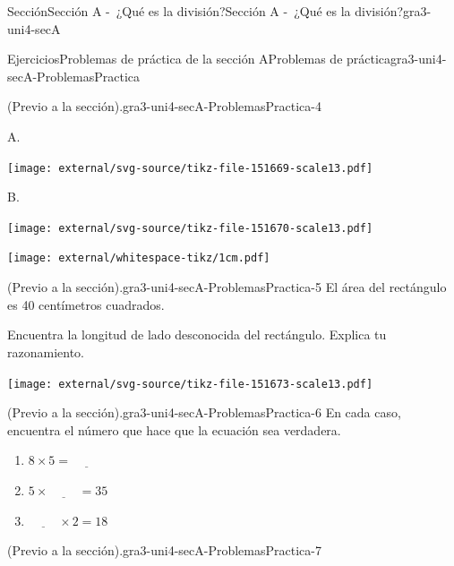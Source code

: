 \begin{sectionptx}{Sección}{Sección A -~¿Qué es la división?}{}{Sección A -~¿Qué es la división?}{}{}{gra3-uni4-secA}
\begin{exercises-subsection}{Ejercicios}{Problemas de práctica de la sección A}{}{Problemas de práctica}{}{}{gra3-uni4-secA-ProblemasPractica}
\begin{divisionexercise}{2}{(Previo a la sección).}{}{gra3-uni4-secA-ProblemasPractica-4}
\begin{sidebyside}{2}{0.05}{0.05}{0.1}
\begin{sbspanel}{0.3}%
A.%
\par
\texttt{[image: external/svg-source/tikz-file-151669-scale13.pdf]}
\end{sbspanel}%
\begin{sbspanel}{0.5}%
B.%
\par
\texttt{[image: external/svg-source/tikz-file-151670-scale13.pdf]}
\end{sbspanel}%
\end{sidebyside}%
\begin{image}{0}{1}{0}{}%
\texttt{[image: external/whitespace-tikz/1cm.pdf]}
\end{image}%
\end{divisionexercise}%
\begin{divisionexercise}{3}{(Previo a la sección).}{}{gra3-uni4-secA-ProblemasPractica-5}%
El área del rectángulo es 40 centímetros cuadrados.%
\begin{sidebyside}{2}{0}{0}{0}%
\begin{sbspanel}{0.5}%
Encuentra la longitud de lado desconocida del rectángulo. Explica tu razonamiento.%
\end{sbspanel}%
\begin{sbspanel}{0.5}%
\texttt{[image: external/svg-source/tikz-file-151673-scale13.pdf]}
\end{sbspanel}%
\end{sidebyside}%
\end{divisionexercise}%
\begin{divisionexercise}{4}{(Previo a la sección).}{}{gra3-uni4-secA-ProblemasPractica-6}%
En cada caso, encuentra el número que hace que la ecuación sea verdadera.%
\par
%
\begin{enumerate}[label={(\alph*)}]
\item{}\(\displaystyle 8 \times 5 = \underline{\hspace{1cm}}\)%
\item{}\(\displaystyle 5 \times \underline{\hspace{1cm}} = 35\)%
\item{}\(\displaystyle \underline{\hspace{1cm}} \times 2 = 18\)%
\end{enumerate}
%
\end{divisionexercise}%
\begin{divisionexercise}{5}{(Previo a la sección).}{}{gra3-uni4-secA-ProblemasPractica-7}%

\end{divisionexercise}
\end{exercises-subsection}
\end{sectionptx}
